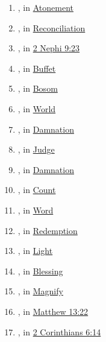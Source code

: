 \begin{enumerate}
		\item \hyperref[KATALLAGE]{}, in \hyperref[ATONEMENT]{Atonement}
		
		\item \hyperref[KATALLASSO]{}, in \hyperref[RECONCILIATION]{Reconciliation}
		
		\item \hyperref[KATARTIZO]{}, in \hyperref[2NEPHI-9-23-perfect]{2 Nephi 9:23}
		
		\item \hyperref[KOLAPHIZO]{}, in \hyperref[BUFFET]{Buffet}
		
		\item \hyperref[KOLPOS]{}, in \hyperref[BOSOM]{Bosom}
		
		\item \hyperref[KOSMOS]{}, in \hyperref[WORLD]{World}
		
		\item \hyperref[KRIMA]{}, in \hyperref[DAMNATION]{Damnation}
		
		\item \hyperref[KRINO]{}, in \hyperref[JUDGE]{Judge}
		
		\item \hyperref[KRISIS]{}, in \hyperref[DAMNATION]{Damnation}
		
		\item \hyperref[LOGIZOMAI]{}, in \hyperref[COUNT]{Count}
		
		\item \hyperref[LOGOS]{}, in \hyperref[WORD]{Word}
		
		\item \hyperref[LUTROSIS]{}, in \hyperref[REDEMPTION]{Redemption}
		
		\item \hyperref[LUCHNOS]{}, in \hyperref[LIGHT]{Light}
		
		\item \hyperref[MAKARIOS]{}, in \hyperref[BLESSING]{Blessing}
		
		\item \hyperref[MEGALUNO]{}, in \hyperref[MAGNIFY]{Magnify}
		
		\item \hyperref[MERIMNA]{}, in \hyperref[MATTHEW-13-22]{Matthew 13:22}
		
		\item \hyperref[2CORINTHIANS-6-14-metoche]{}, in \hyperref[2CORINTHIANS-6-14]{2 Corinthians 6:14}
		

\end{enumerate}
